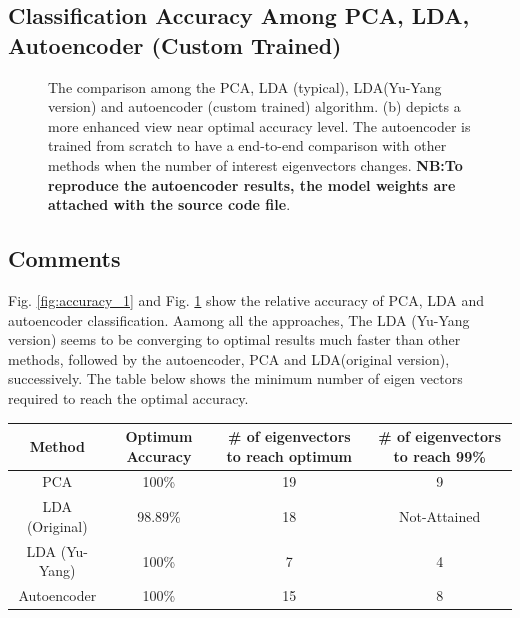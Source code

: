 \documentclass{article}
\begin{document}
\subsection{Classification Accuracy Among PCA, LDA, Autoencoder (Custom Trained)}
\begin{figure}[!htbp]
     \centering
     \captionsetup[subfigure]{labelformat=empty}
    \caption{The comparison among the PCA, LDA (typical), LDA(Yu-Yang version) and autoencoder (custom trained) algorithm. (b) depicts a more enhanced view near optimal accuracy level. The autoencoder is trained from scratch to have a end-to-end comparison with other methods when the number of interest eigenvectors changes. \textbf{NB:To reproduce the autoencoder results, the model weights are attached with the source code file}.}
    \label{fig:accuracy_2}
\end{figure}
\subsection{Comments}
Fig. \ref{fig:accuracy_1} and Fig. \ref{fig:accuracy_2} show the relative accuracy of PCA, LDA and autoencoder classification. Aamong all the approaches, The LDA (Yu-Yang version) seems to be converging to optimal results much faster than other methods, followed by the autoencoder, PCA and LDA(original version), successively. The table below shows the minimum number of eigen vectors required to reach the optimal accuracy.
\begin{center}
\begin{tabular}{||c c c c||} 
 \hline
 Method & Optimum Accuracy & \# of eigenvectors to reach optimum & \# of eigenvectors to reach 99\% \\ [0.5ex] 
 \hline\hline
 PCA & 100\% & 19 & 9 \\ 
 \hline
 LDA (Original) & 98.89\% & 18 & Not-Attained \\
 \hline
 LDA (Yu-Yang) & 100\% & 7 & 4  \\
 \hline
 Autoencoder & 100\% & 15 & 8 \\
 \hline
\end{tabular}
\end{center}
\end{document}
